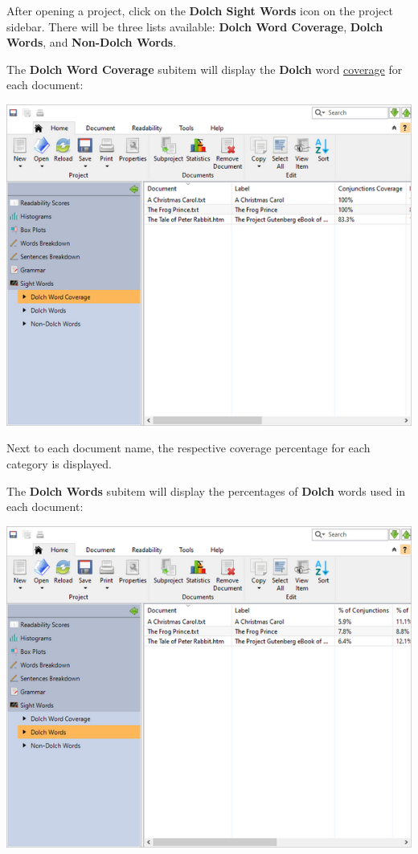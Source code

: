 \documentclass[
]{book}
\theoremstyle{definition}
\theoremstyle{definition}
\theoremstyle{definition}
\theoremstyle{definition}
\theoremstyle{remark}
\begin{document}
After opening a project, click on the \textbf{Dolch Sight Words} icon on the project sidebar. There will be three lists available: \textbf{Dolch Word Coverage}, \textbf{Dolch Words}, and \textbf{Non-Dolch Words}.

The \textbf{Dolch Word Coverage} subitem will display the \textbf{Dolch} word \protect\hyperlink{reviewing-dolch}{coverage} for each document:

\includegraphics{Images/batchdolchcoverage.png}

Next to each document name, the respective coverage percentage for each category is displayed.

The \textbf{Dolch Words} subitem will display the percentages of \textbf{Dolch} words used in each document:

\includegraphics{Images/batchdolchwords.png}
\end{document}
